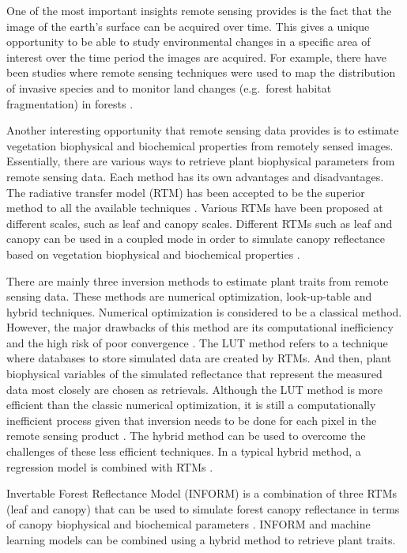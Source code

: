 \documentclass[a4paper, twoside]{templates/ociamthesis}
\begin{document}
One of the most important insights remote sensing provides is the fact that the image of the earth's surface can be acquired over time. This gives a unique opportunity to be able to study environmental changes in a specific area of interest over the time period the images are acquired. For example, there have been studies where remote sensing techniques were used to map the distribution of invasive species and to monitor land changes (e.g.~forest habitat fragmentation) in forests \citep{lechner2020applications}.

Another interesting opportunity that remote sensing data provides is to estimate vegetation biophysical and biochemical properties from remotely sensed images. Essentially, there are various ways to retrieve plant biophysical parameters from remote sensing data. Each method has its own advantages and disadvantages. The radiative transfer model (RTM) has been accepted to be the superior method to all the available techniques \citep{darvishzadeh2019analysis, wang2018mapping}. Various RTMs have been proposed at different scales, such as leaf and canopy scales. Different RTMs such as leaf and canopy can be used in a coupled mode in order to simulate canopy reflectance based on vegetation biophysical and biochemical properties \citep{morcillo2019quantifying}.

There are mainly three inversion methods to estimate plant traits from remote sensing data. These methods are numerical optimization, look-up-table and hybrid techniques. Numerical optimization is considered to be a classical method. However, the major drawbacks of this method are its computational inefficiency and the high risk of poor convergence \citep{zhang2021analyzing}. The LUT method refers to a technique where databases to store simulated data are created by RTMs. And then, plant biophysical variables of the simulated reflectance that represent the measured data most closely are chosen as retrievals. Although the LUT method is more efficient than the classic numerical optimization, it is still a computationally inefficient process given that inversion needs to be done for each pixel in the remote sensing product \citep{danner2021efficient}. The hybrid method can be used to overcome the challenges of these less efficient techniques. In a typical hybrid method, a regression model is combined with RTMs \citep{zhang2021analyzing}.

Invertable Forest Reflectance Model (INFORM) is a combination of three RTMs (leaf and canopy) that can be used to simulate forest canopy reflectance in terms of canopy biophysical and biochemical parameters \citep{atzberger2000development, schlerf2006inversion}. INFORM and machine learning models can be combined using a hybrid method to retrieve plant traits.
\end{document}
